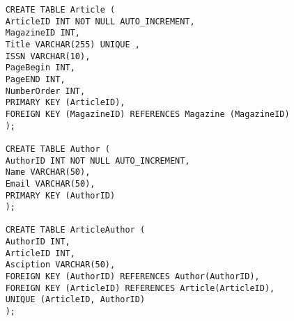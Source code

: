 \documentclass[13pt,a4paper]{report}
\begin{document}
\begin{itemize}
\begin{lstlisting}
	CREATE TABLE Article ( 
	ArticleID INT NOT NULL AUTO_INCREMENT, 
	MagazineID INT,
	Title VARCHAR(255) UNIQUE , 
	ISSN VARCHAR(10), 
	PageBegin INT, 
	PageEND INT, 
	NumberOrder INT, 
	PRIMARY KEY (ArticleID),
	FOREIGN KEY (MagazineID) REFERENCES Magazine (MagazineID)
	);

	CREATE TABLE Author ( 
	AuthorID INT NOT NULL AUTO_INCREMENT, 
	Name VARCHAR(50), 
	Email VARCHAR(50), 
	PRIMARY KEY (AuthorID)
	);

	CREATE TABLE ArticleAuthor ( 
	AuthorID INT, 
	ArticleID INT,
	Asciption VARCHAR(50), 
	FOREIGN KEY (AuthorID) REFERENCES Author(AuthorID), 
	FOREIGN KEY (ArticleID) REFERENCES Article(ArticleID),
	UNIQUE (ArticleID, AuthorID)
	);
\end{lstlisting}

\end{itemize}
\end{document}
